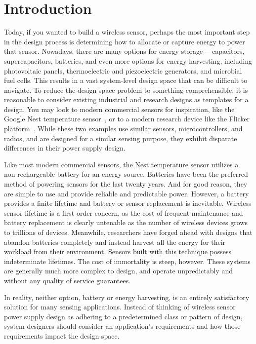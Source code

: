\chapter{Introduction}
\label{chap:intro}

Today, if you wanted to build a wireless sensor, perhaps the most important step in the design process is determining how to allocate or capture energy to power that sensor. 
Nowadays, there are many options for energy storage--- capacitors, supercapacitors, batteries, and even more options for energy harvesting, including photovoltaic panels, thermoelectric and piezoelectric generators, and microbial fuel cells.
This results in a vast system-level design space that can be difficult to navigate.
To reduce the design space problem to something comprehensible, it is reasonable to consider existing industrial and research designs as templates for a design.
You may look to modern commercial sensors for inspiration, like the Google Nest temperature sensor~\cite{googleNestTemperature}, or to a modern research device like the Flicker platform~\cite{hesterFlicker17}.
While these two examples use similar sensors, microcontrollers, and radios, and are designed for a similar sensing purpose, they exhibit disparate differences in their power supply design.

Like most modern commercial sensors, the Nest temperature sensor utilizes a non-rechargeable battery for an energy source. 
Batteries have been the preferred method of powering sensors for the last twenty years. And for good reason, they are simple to use and provide reliable and predictable power.
However, a battery provides a finite lifetime and battery or sensor replacement is inevitable.
Wireless sensor lifetime is a first order concern, as the cost of frequent maintenance and battery replacement is clearly untenable as the number of wireless devices grows to trillions of devices.
Meanwhile, researchers have forged ahead with designs that abandon batteries completely and instead harvest all the energy for their workload from their environment.
Sensors built with this technique possess indeterminate lifetimes. The cost of immortality is steep, however.
These systems are generally much more complex to design, and operate unpredictably and without any quality of service guarantees.

In reality, neither option, battery or energy harvesting, is an entirely satisfactory solution for many sensing applications. 
Instead of thinking of wireless sensor power supply design as adhering to a predetermined class or pattern of design, system designers should consider an application's requirements and how those requirements impact the design space.

